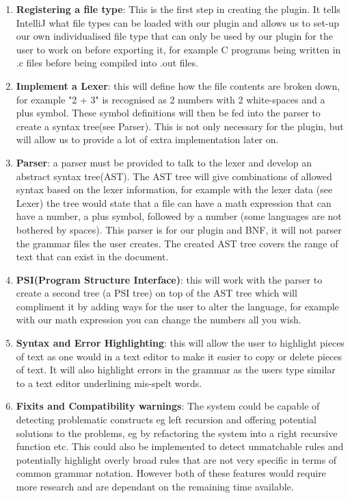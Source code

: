 \documentclass{l3proj}
\begin{document}
\begin{enumerate}
	\item \textbf{Registering a file type}: This is the first step in creating the plugin. It tells IntelliJ what file types can be loaded with our plugin and allows us to set-up our own individualised file type that can only be used by our plugin for the user to work on before exporting it, for example C programs being written in .c files before being compiled into .out files.
	\item \textbf{Implement a Lexer}: this will define how the file contents are broken down, for example "2 + 3" is recognised as 2 numbers with 2 white-spaces and a plus symbol. These symbol definitions will then be fed into the parser to create a syntax tree(see Parser). This is not only necessary for the plugin, but will allow us to provide a lot of extra implementation later on.
	\item \textbf{Parser}: a parser must be provided to talk to the lexer and develop an abstract syntax tree(AST). The AST tree will give combinations of allowed syntax based on the lexer information, for example with the lexer data (see Lexer) the tree would state that a file can have a math expression that can have a number, a plus symbol, followed by a number (some languages are not bothered by spaces). This parser is for our plugin and BNF, it will not parser the grammar files the user creates. The created AST tree covers the range of text that can exist in the document.
	\item \textbf{PSI(Program Structure Interface)}: this will work with the parser to create a second tree (a PSI tree) on top of the AST tree which will compliment it by adding ways for the user to alter the language, for example with our math expression you can change the numbers all you wish. 
	\item \textbf{Syntax and Error Highlighting}: this will allow the user to highlight pieces of text as one would in a text editor to make it easier to copy or delete pieces of text. It will also highlight errors in the grammar as the users type similar to a text editor underlining mis-spelt words.
	\item \textbf{Fixits and Compatibility warnings}: The system could be capable of detecting problematic constructs eg left recursion and offering potential solutions to the problems, eg by refactoring the system into a right recursive function etc. This could also be implemented to detect unmatchable rules and potentially highlight overly broad rules that are not very specific in terms of common grammar notation. However both of these features would require more research and are dependant on the remaining time available. 

\end{enumerate}
\end{document}
